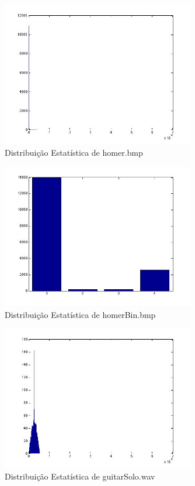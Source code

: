 \documentclass[12pt]{article}
\begin{document}
  \begin{figure}[H]
    \centering
      \includegraphics[width=0.75\textwidth]{ex5homer}
    \caption{Distribuição Estatística de homer.bmp}
  \end{figure}

  \begin{figure}[H]
    \centering
      \includegraphics[width=0.75\textwidth]{ex5homerbin}
    \caption{Distribuição Estatística de homerBin.bmp}
  \end{figure}

  \begin{figure}[H]
    \centering
      \includegraphics[width=0.75\textwidth]{ex5guitarsolo}
    \caption{Distribuição Estatística de guitarSolo.wav}
  \end{figure}
\end{document}
